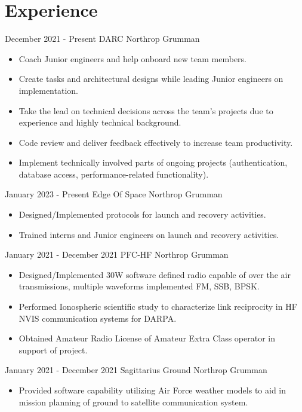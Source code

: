 \documentclass[]{src/friggeri-cv}
\begin{document}
\section{Experience}
\begin{entrylist}
  \entry
    {December 2021 - Present}
    {DARC}
    {Northrop Grumman}
    {\begin{itemize}
        \item Coach Junior engineers and help onboard new team members.
        \item Create tasks and architectural designs while leading Junior engineers on implementation.
        \item Take the lead on technical decisions across the team's projects due to experience and highly technical background.
        \item Code review and deliver feedback effectively to increase team productivity.
        \item Implement technically involved parts of ongoing projects (authentication, database access, performance-related functionality).
    \end{itemize}}
  \entry
    {January 2023 - Present}
    {Edge Of Space}
    {Northrop Grumman}
    {\begin{itemize}
        \item Designed/Implemented protocols for launch and recovery activities.
        \item Trained interns and Junior engineers on launch and recovery activities.
    \end{itemize}}
  \entry
    {January 2021 - December 2021}
    {PFC-HF}
    {Northrop Grumman}
    {\begin{itemize}
        \item Designed/Implemented 30W software defined radio capable of over the air transmissions, multiple waveforms implemented FM, SSB, BPSK.
        \item Performed Ionospheric scientific study to characterize link reciprocity in HF NVIS communication systems for DARPA.
        \item Obtained Amateur Radio License of Amateur Extra Class operator in support of project.
    \end{itemize}}
  \entry
    {January 2021 - December 2021}
    {Sagittarius Ground}
    {Northrop Grumman}
    {\begin{itemize}
        \item Provided software capability utilizing Air Force weather models to aid in mission planning of ground to satellite communication system.

\end{itemize}}
\end{entrylist}
\end{document}
